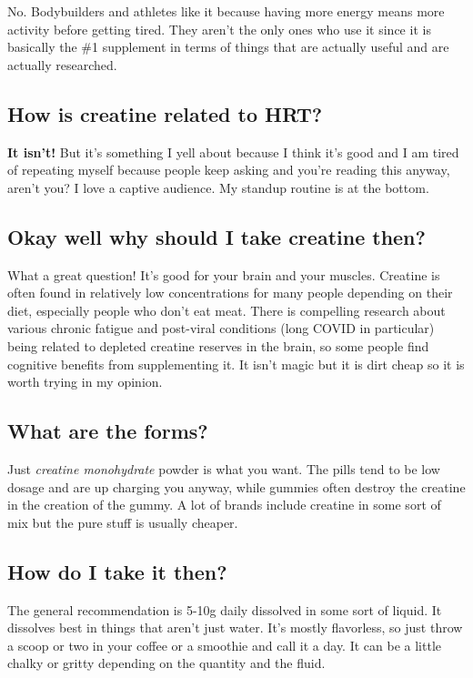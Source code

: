 \documentclass{article}
\begin{document}
No. Bodybuilders and athletes like it because having more energy means more activity before getting tired. They aren’t the only ones who use it since it is basically the \#1 supplement in terms of things that are actually useful and are actually researched.

\subsection{How is creatine related to HRT?}

\textbf{It isn’t!} But it’s something I yell about because I think it’s good and I am tired of repeating myself because people keep asking and you’re reading this anyway, aren’t you? I love a captive audience. My standup routine is at the bottom.

\subsection{Okay well why should I take creatine then?}

What a great question! It’s good for your brain and your muscles. Creatine is often found in relatively low concentrations for many people depending on their diet, especially people who don’t eat meat. There is compelling research about various chronic fatigue and post-viral conditions (long COVID in particular) being related to depleted creatine reserves in the brain, so some people find cognitive benefits from supplementing it. It isn’t magic but it is dirt cheap so it is worth trying in my opinion.

\subsection{What are the forms?}

Just \textit{creatine monohydrate} powder is what you want. The pills tend to be low dosage and are up charging you anyway, while gummies often destroy the creatine in the creation of the gummy. A lot of brands include creatine in some sort of mix but the pure stuff is usually cheaper.

\subsection{How do I take it then?}

The general recommendation is 5-10g daily dissolved in some sort of liquid. It dissolves best in things that aren’t just water. It’s mostly flavorless, so just throw a scoop or two in your coffee or a smoothie and call it a day. It can be a little chalky or gritty depending on the quantity and the fluid.
\end{document}
